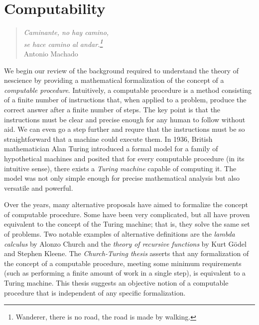 %
%


\chapter{Computability}
\label{chap:Computability}

\begin{quote}
\begin{flushright}
\emph{Caminante, no hay camino,\\
se hace camino al andar.\footnote{Wanderer, there is no road, the road is made by walking.}}\\
Antonio Machado
\end{flushright}
\end{quote}
\bigskip

We begin our review of the background required to understand the theory of nescience by providing a mathematical formalization of the concept of a \emph{computable procedure}. Intuitively, a computable procedure is a method consisting of a finite number of instructions that, when applied to a problem, produce the correct answer after a finite number of steps. The key point is that the instructions must be clear and precise enough for any human to follow without aid. We can even go a step further and requre that the instructions must be so straightforward that a machine could execute them. In 1936, British mathematician Alan Turing introduced a formal model for a family of hypothetical machines and posited that for every computable procedure (in its intuitive sense), there exists a \emph{Turing machine} capable of computing it. The model was not only simple enough for precise mathematical analysis but also versatile and powerful.

Over the years, many alternative proposals have aimed to formalize the concept of computable procedure. Some have been very complicated, but all have proven equivalent to the concept of the Turing machine; that is, they solve the same set of problems. Two notable examples of alternative definitions are the \emph{lambda calculus} by Alonzo Church and the \emph{theory of recursive functions} by Kurt Gödel and Stephen Kleene. The \emph{Church-Turing thesis} asserts that any formalization of the concept of a computable procedure, meeting some minimum requirements (such as performing a finite amount of work in a single step), is equivalent to a Turing machine. This thesis suggests an objective notion of a computable procedure that is independent of any specific formalization.

